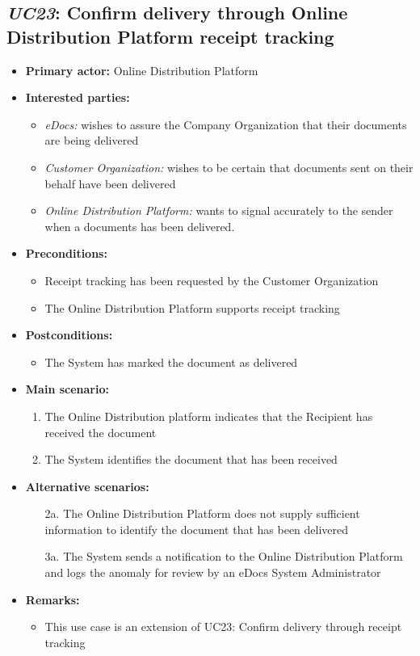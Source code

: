 \documentclass[a4paper,10pt]{article}
\begin{document}
\subsection{\emph{UC23}: Confirm delivery through Online Distribution Platform receipt tracking}
\begin{itemize}
	\item \textbf{Primary actor:} Online Distribution Platform
	\item \textbf{Interested parties:} 
	\begin{itemize}
		\item \textit{eDocs:} wishes to assure the Company Organization that their documents are being delivered
		\item \textit{Customer Organization:} wishes to be certain that documents sent on their behalf have been delivered
        \item \textit{Online Distribution Platform:} wants to signal accurately to the sender when a documents has been delivered.
	\end{itemize}
	
	\item \textbf{Preconditions:}
	\begin{itemize}
		\item Receipt tracking has been requested by the Customer Organization
		\item The Online Distribution Platform supports receipt tracking
	\end{itemize}
	
	\item \textbf{Postconditions:}
	\begin{itemize}
		\item The System has marked the document as delivered
	\end{itemize}
	
	\item \textbf{Main scenario:} 
	\begin{enumerate}
		\item The Online Distribution platform indicates that the Recipient has received the document
		\item The System identifies the document that has been received
	\end{enumerate}
	
	\item \textbf{Alternative scenarios:} 
	\begin{enumerate}
		\item [2a.] The Online Distribution Platform does not supply sufficient information to identify the document that has been delivered
		\item [3a.] The System sends a notification to the Online Distribution Platform and logs the anomaly for review by an eDocs System Administrator
	\end{enumerate}
	
	\item \textbf{Remarks:}
	\begin{itemize}
		\item This use case is an extension of UC23: Confirm delivery through receipt tracking
	\end{itemize}
\end{itemize}
\end{document}
